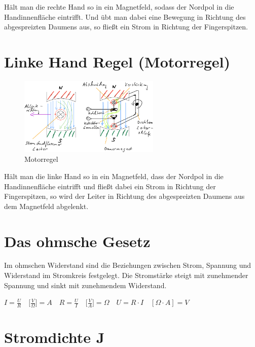 Hält man die rechte Hand so in ein Magnetfeld, sodass der Nordpol in die
Handinnenfläche eintrifft. Und übt man dabei eine Bewegung in Richtung
des abgespreizten Daumens aus, so fließt ein Strom in Richtung der
Fingerspitzen.

\section{Linke Hand Regel
(Motorregel)}\label{linke-hand-regel-motorregel}

\begin{figure}[!ht]%
\centering
\includegraphics[width=0.6\textwidth]{images/Skizze/02_Motorregel_Skizze.pdf}
\caption{Motorregel}
\end{figure}

Hält man die linke Hand so in ein Magnetfeld, dass der Nordpol in die
Handinnenfläche eintrifft und fließt dabei ein Strom in Richtung der
Fingerspitzen, so wird der Leiter in Richtung des abgespreizten Daumens
aus dem Magnetfeld abgelenkt.

\section{Das ohmsche Gesetz}\label{das-ohmsche-gesetz}

Im ohmschen Widerstand sind die Beziehungen zwischen Strom, Spannung und
Widerstand im Stromkreis festgelegt. Die Stromstärke steigt mit
zunehmender Spannung und sinkt mit zunehmendem Widerstand.

$\boxed{I = \frac{U}{R}} \quad \bigl[\frac{V}{\Omega}\bigl] = A \quad  \boxed{R = \frac{U}{I}} \quad \bigl[\frac{V}{A}\bigl] = \Omega \quad  \boxed{U = R \cdot I} \quad [\Omega \cdot A] = V$

\newpage

\section{Stromdichte J}\label{stromdichte-j}

